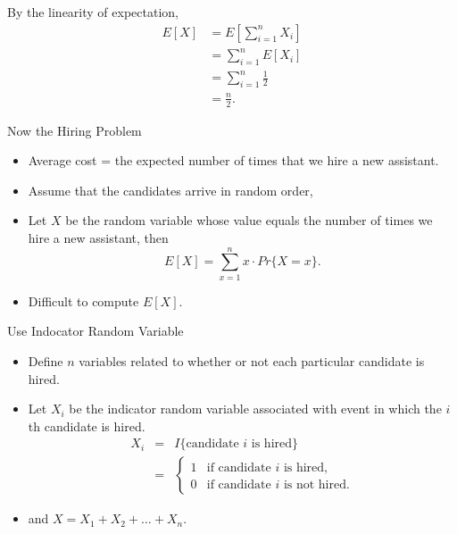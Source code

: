 \documentclass{beamer}
\begin{document}
\begin{frame}{}

By the linearity of expectation, 
\begin{align*}
E[X] &= E\left [\sum_{i=1}^n X_i\right ] \\
 &= \sum_{i=1}^n E\left [X_i\right ] \\
 &= \sum_{i=1}^n\frac{1}{2} \\
 &=\frac{n}{2}.
\end{align*}
\end{frame}

\begin{frame}{Now the Hiring Problem}
\begin{itemize}
\item Average cost = the expected number of times that we hire a new assistant. 
\item Assume that the candidates arrive in random order, 
\item Let $X$ be the random variable whose value equals the number of times we hire a new assistant, then $$E[X] = \sum_{x=1}^n x\cdot Pr\{X=x\}.$$
\item Difficult to compute $E[X]$. 
\end{itemize}
\end{frame}

\begin{frame}{Use Indocator Random Variable}
\begin{itemize}
\item Define $n$ variables related to whether or not each particular candidate is hired. 
\item Let $X_i$ be the indicator random variable associated with event in which the $i$th candidate is hired. 
\begin{eqnarray*}
X_i &=& I\{\mbox{candidate $i$ is hired}\} \\
 &=& 
 \left \{ 
 \begin{array}{ll} 
1 & \mbox {if candidate $i$ is hired,} \\ 
0 & \mbox {if  candidate $i$ is not hired.}  
\end{array}
\right.
\end{eqnarray*}
\item and $X=X_1+X_2+\ldots+X_n.$
\end{itemize}
\end{frame}
\end{document}
